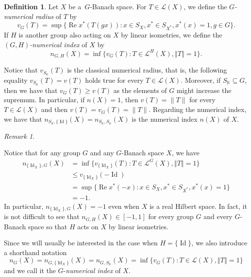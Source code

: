 \documentclass[a4paper,12pt]{amsart}
\theoremstyle{definition}
\theoremstyle{definition}
\newtheorem{definition}[theorem]{Definition}
\theoremstyle{remark}
\newtheorem{remark}[theorem]{Remark}
\numberwithin{equation}{section}
\newcommand{\K}{\mathbb{K}}
\DeclareMathOperator{\re}{Re}
\DeclareMathOperator{\id}{Id}
\renewcommand{\geq}{\geqslant}
\newcommand{\<}{\langle}
\renewcommand{\>}{\rangle}
\newcommand{\norm}[1]{\left\Vert#1\right\Vert}
\begin{document}
	
	\begin{definition}
		Let $X$ be a~$G$-Banach space. For $T \in \mathcal{L}(X)$, we define the {\it $G$-numerical radius} of $T$ by 
		\begin{equation*}
			v_G(T) = \sup \{ \re x^*(T(gx)) : x \in S_X, x^* \in S_{X^*}, x^*(x) = 1, g \in G \}.
		\end{equation*}
		If $H$ is another group also acting on $X$ by linear isometries, we define the {\it $(G,H)$-numerical index} of $X$ by
		\begin{equation*}
			n_{G, H}(X) = \inf \{ v_G(T) : T \in \mathcal{L}^H(X), \norm{T} = 1 \}.
		\end{equation*}
	\end{definition}
	Notice that $v_{S_\K}(T)$ is the classical numerical radius, that is, the following equality $v_{S_{\K}}(T) = v(T)$ holds true for every $T \in \mathcal{L}(X)$. Moreover, if $S_{\K} \subseteq G$, then we have that $v_G(T) \geq v(T)$ as the elements of $G$ might increase the supremum. In particular, if $n(X) = 1$, then $v(T) = \|T\|$ for every $T \in \mathcal{L}(X)$ and then $v(T) = v_G(T) = \|T\|$. Regarding the numerical index, we have that $n_{S_\K, \{\id\}}(X) = n_{S_\K, S_\K}(X)$ is the numerical index $n(X)$ of $X$. 
	
	\begin{remark} \label{rem:GnumIndex}
		
		Notice that for any group $G$ and any $G$-Banach space $X$, we have
		\begin{align*}
			n_{\{\id_X\}, G}(X)
			&= \inf \{ v_{\{\id_X\}}(T) : T \in \mathcal{L}^G(X), \norm{T} = 1 \} \\
			&\le v_{\{\id_X\}}(-\id)\\
			&= \sup \{ \re x^*(-x) : x \in S_X, x^* \in S_{X^*}, x^*(x) = 1 \}\\
			&= -1.
		\end{align*}
		In particular, $n_{\{\id_X\}, G}(X) = - 1$ even when $X$ is a real Hilbert space. In fact, it is not difficult to see that $n_{G,H}(X) \in [-1,1]$ for every group $G$ and every $G$-Banach space so that $H$ acts on $X$ by linear isometries.
	\end{remark}
	
	Since we will usually be interested in the case when $H = \{\id\}$, we also introduce a shorthand notation
	\begin{equation} \label{G-numerical-index}
		n_G(X)
		= n_{G, \{\id_X\}}(X) = n_{G, S_\K}(X)
		= \inf \{v_G(T): T \in \mathcal{L}(X), \norm{T} = 1 \}
	\end{equation}
	and we call it the $G$-{\it numerical index} of $X$.
	
\end{document}

